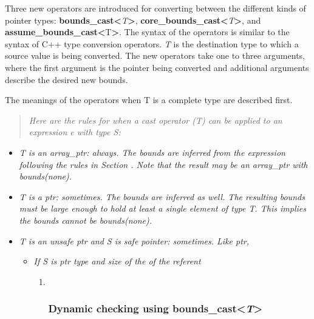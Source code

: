 \documentclass[]{article}
\begin{document}
Three new operators are introduced for converting between the different
kinds of pointer types:
\textbf{bounds\_cast\textless{}}\emph{T}\textbf{\textgreater{}},
\textbf{core\_bounds\_cast\textless{}}\emph{T}\textbf{\textgreater{}},
and \textbf{assume\_bounds\_cast\textless{}}T\textbf{\textgreater{}}.
The syntax of the operators is similar to the syntax of C++ type
conversion operators. \emph{T} is the destination type to which a source
value is being converted. The new operators take one to three arguments,
where the first argument is the pointer being converted and additional
arguments describe the desired new bounds.

The meanings of the operators when T is a complete type are described
first.

\begin{quote}
\emph{Here are the rules for when a cast operator (T) can be applied to
an expression e with type S:}
\end{quote}

\begin{itemize}
\item
  \emph{T is an array\_ptr: always. The bounds are inferred from the
  expression following the rules in Section . Note that the result may
  be an array\_ptr with bounds(none).}
\item
  \emph{T is a ptr: sometimes. The bounds are inferred as well. The
  resulting bounds must be large enough to hold at least a single
  element of type T. This implies the bounds cannot be bounds(none).}
\item
  \emph{T is an unsafe ptr and S is safe pointer: sometimes. Like ptr, }

  \begin{itemize}
  \item
    \emph{If S is ptr type and size of the of the referent }

    \begin{enumerate}
    \def\labelenumi{\arabic{enumi}.}
    \item ~
      \subsubsection{\texorpdfstring{\protect\hypertarget{ux5fToc437460797}{}{\protect\hypertarget{ux5fToc440445478}{}{\protect\hypertarget{ux5fToc440449260}{}{\protect\hypertarget{ux5fToc440551910}{}{}}}}Dynamic
      checking using
      bounds\_cast\textless{}\emph{T}\textgreater{}}{Dynamic checking using bounds\_cast\textless{}T\textgreater{}}}\label{dynamic-checking-using-boundsux5fcastt}
    \end{enumerate}
  \end{itemize}
\end{itemize}
\end{document}
